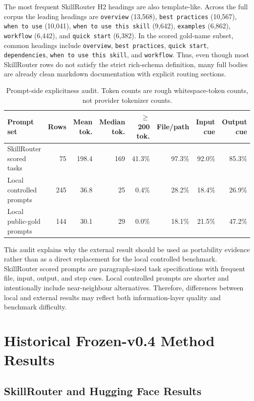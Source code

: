 The most frequent SkillRouter H2 headings are also template-like. Across the full corpus the leading headings are \texttt{overview} (13,568), \texttt{best practices} (10,567), \texttt{when to use} (10,041), \texttt{when to use this skill} (9,642), \texttt{examples} (6,862), \texttt{workflow} (6,442), and \texttt{quick start} (6,382). In the scored gold-name subset, common headings include \texttt{overview}, \texttt{best practices}, \texttt{quick start}, \texttt{dependencies}, \texttt{when to use this skill}, and \texttt{workflow}. Thus, even though most SkillRouter rows do not satisfy the strict rich-schema definition, many full bodies are already clean markdown documentation with explicit routing sections.

\begin{table}[h]
\centering
\scriptsize
\setlength{\tabcolsep}{3pt}
\begin{tabular}{p{}rrrrrrr}
\toprule
Prompt set & Rows & Mean tok. & Median tok. & \(\geq\)200 tok. & File/path & Input cue & Output cue \\
\midrule
SkillRouter scored tasks & 75 & 198.4 & 169 & 41.3\% & 97.3\% & 92.0\% & 85.3\% \\
Local controlled prompts & 245 & 36.8 & 25 & 0.4\% & 28.2\% & 18.4\% & 26.9\% \\
Local public-gold prompts & 144 & 30.1 & 29 & 0.0\% & 18.1\% & 21.5\% & 47.2\% \\
\bottomrule
\end{tabular}
\caption{Prompt-side explicitness audit. Token counts are rough whitespace-token counts, not provider tokenizer counts.}
\label{tab:skillrouter-prompt-audit}
\end{table}

This audit explains why the external result should be used as portability evidence rather than as a direct replacement for the local controlled benchmark. SkillRouter scored prompts are paragraph-sized task specifications with frequent file, input, output, and step cues. Local controlled prompts are shorter and intentionally include near-neighbour alternatives. Therefore, differences between local and external results may reflect both information-layer quality and benchmark difficulty.

\section{Historical Frozen-v0.4 Method Results}

\subsection{SkillRouter and Hugging Face Results}

